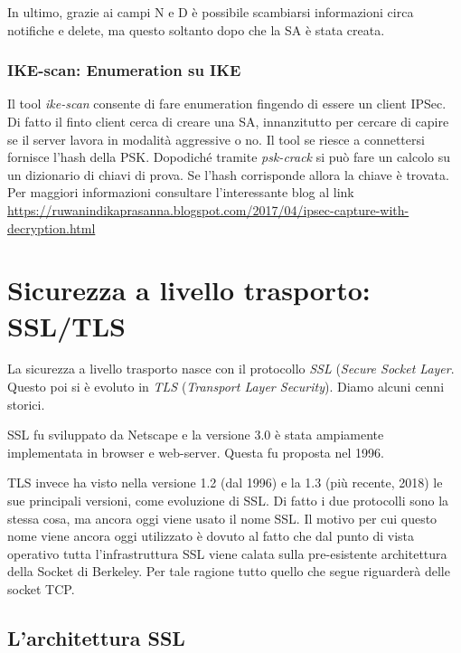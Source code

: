 \documentclass[14pt]{extreport}
\begin{document}
In ultimo, grazie ai campi N e D è possibile scambiarsi informazioni circa notifiche e delete, ma questo soltanto dopo che la SA è stata creata.


\subsection{IKE-scan: Enumeration su IKE}

Il tool \textit{ike-scan} consente di fare enumeration fingendo di essere un client IPSec. Di fatto il finto client cerca di creare una SA, innanzitutto per cercare di capire se il server lavora in modalità aggressive o no. Il tool se riesce a connettersi fornisce l'hash della PSK. Dopodiché tramite \textit{psk-crack} si può fare un calcolo su un dizionario di chiavi di prova. Se l'hash corrisponde allora la chiave è trovata. Per maggiori informazioni consultare l'interessante blog al link \url{https://ruwanindikaprasanna.blogspot.com/2017/04/ipsec-capture-with-decryption.html}






\chapter{Sicurezza a livello trasporto: SSL/TLS}

La sicurezza a livello trasporto nasce con il protocollo \textit{SSL} (\textit{Secure Socket Layer}. Questo poi si è evoluto in \textit{TLS} (\textit{Transport Layer Security}). Diamo alcuni cenni storici.

SSL fu sviluppato da Netscape e la versione 3.0 è stata ampiamente implementata in browser e web-server. Questa fu proposta nel 1996.

TLS invece ha visto nella versione 1.2 (dal 1996) e la 1.3 (più recente, 2018) le sue principali versioni, come evoluzione di SSL. Di fatto i due protocolli sono la stessa cosa, ma ancora oggi viene usato il nome  SSL. Il motivo per cui questo nome viene ancora oggi utilizzato è dovuto al fatto che dal punto di vista operativo tutta l'infrastruttura SSL viene calata sulla pre-esistente architettura della Socket di Berkeley. Per tale ragione tutto quello che segue riguarderà delle socket TCP.



\section{L'architettura SSL}
\end{document}
